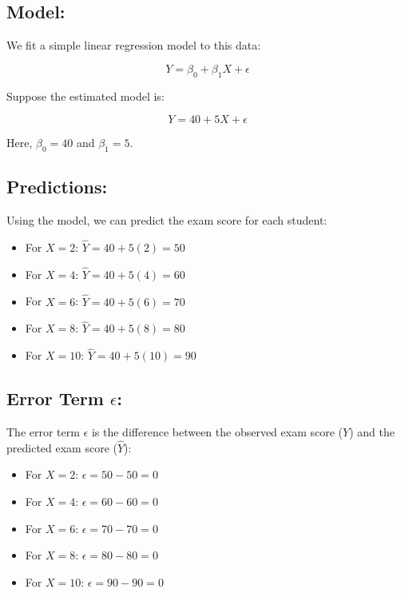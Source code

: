 \documentclass{article}
\begin{document}
\subsection*{Model:}

We fit a simple linear regression model to this data:

\[
Y = \beta_0 + \beta_1 X + \epsilon
\]

Suppose the estimated model is:

\[
Y = 40 + 5X + \epsilon
\]

Here, \( \beta_0 = 40 \) and \( \beta_1 = 5 \).

\subsection*{Predictions:}

Using the model, we can predict the exam score for each student:

\begin{itemize}
    \item For \( X = 2 \): \( \hat{Y} = 40 + 5(2) = 50 \)
    \item For \( X = 4 \): \( \hat{Y} = 40 + 5(4) = 60 \)
    \item For \( X = 6 \): \( \hat{Y} = 40 + 5(6) = 70 \)
    \item For \( X = 8 \): \( \hat{Y} = 40 + 5(8) = 80 \)
    \item For \( X = 10 \): \( \hat{Y} = 40 + 5(10) = 90 \)
\end{itemize}

\subsection*{Error Term \( \epsilon \):}

The error term \( \epsilon \) is the difference between the observed exam score (\( Y \)) and the predicted exam score (\( \hat{Y} \)):

\begin{itemize}
    \item For \( X = 2 \): \( \epsilon = 50 - 50 = 0 \)
    \item For \( X = 4 \): \( \epsilon = 60 - 60 = 0 \)
    \item For \( X = 6 \): \( \epsilon = 70 - 70 = 0 \)
    \item For \( X = 8 \): \( \epsilon = 80 - 80 = 0 \)
    \item For \( X = 10 \): \( \epsilon = 90 - 90 = 0 \)
\end{itemize}
\end{document}
